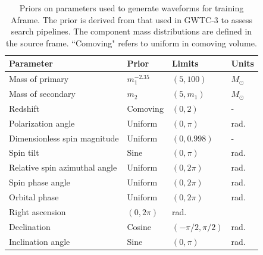 \begin{table}
\centering
\begin{tabular}{ p{4cm} p{1.5cm} p{1.75cm} p{1.5cm} }
\hline
\hline
Parameter & Prior & Limits & Units\\
\hline
Mass of primary & $m_1^{-2.35}$ & $(5, 100)$ & $M_{\odot}$\\
Mass of secondary & $m_2$ & $(5, m_1)$ & $M_{\odot}$\\
Redshift & Comoving & $(0, 2)$ & -\\
Polarization angle & Uniform & $(0, \pi)$ & rad.\\
Dimensionless spin magnitude & Uniform & $(0, 0.998)$ & -\\
Spin tilt & Sine & $(0, \pi)$ & rad.\\
Relative spin azimuthal angle & Uniform & $(0, 2\pi)$ & rad.\\
Spin phase angle & Uniform & $(0, 2\pi)$ & rad.\\
Orbital phase & Uniform & $(0, 2\pi)$ & rad.\\
Right ascension & $(0, 2\pi)$ & rad.\\
Declination &Cosine & $(-\pi/2, \pi/2)$ & rad.\\
Inclination angle & Sine & $(0, \pi)$ & rad.\\
\hline
\hline
\end{tabular}
\caption{Priors on parameters used to generate waveforms for training Aframe. The prior is derived from that used in GWTC-3 to assess search pipelines. The component mass distributions are defined in the source frame. ``Comoving" refers to uniform in comoving volume.}
\label{table:aframe-priors}
\end{table}

